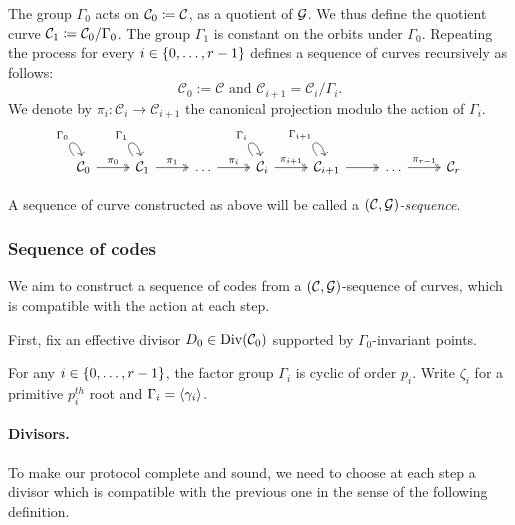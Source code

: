 \documentclass[10pt]{article}
\begin{document}
The group $\Gamma_0$ acts on $\mathcal{C}_0\coloneqq \mathcal{C}$, as a quotient of $\mathcal{G}$. We thus define the quotient curve $\mathcal{C}_1 \coloneqq \mathcal{C}_0 / \Gamma_0$. The group $\Gamma_1$ is constant on the orbits under $\Gamma_0$. Repeating the process for every $i \in \left\{0,\dots,r-1\right\}$ defines a sequence of curves recursively  as follows:
\[\mathcal{C}_0:=\mathcal{C} \text{ and } \mathcal{C}_{i+1}=\mathcal{C}_i/\Gamma_i.\]
We denote by $\pi_i: \mathcal{C}_i \rightarrow \mathcal{C}_{i+1}$ the canonical projection modulo the action of $\Gamma_i$.
\begin{equation}\label{diag:seq_curves}
	\begin{tikzcd}
		\mathcal{C}_0\arrow[loop, distance=14, out=130, in=100,"\Gamma_0"] \arrow[r, two heads, "\pi_0"] & \mathcal{C}_1\arrow[loop, distance=14, out=130, in=100,"\Gamma_1"] \arrow[r, two heads, "\pi_1"] & \dots  \arrow[r, two heads, "\pi_i"] & \mathcal{C}_i\arrow[loop, distance=14, out=130, in=100,"\Gamma_i"] \arrow[r, two heads, "\pi_{i+1}"]& \mathcal{C}_{i+1}\arrow[loop, distance=14, out=130, in=100,"\Gamma_{i+1}"] \arrow[r, two heads] & \dots \arrow[r, two heads,"\pi_{r-1}"] & \mathcal{C}_{r}
	\end{tikzcd}
\end{equation}

\begin{definition}
	A sequence of curve constructed as above will be called a \emph{$(\mathcal{C},\mathcal{G})$-sequence}.
\end{definition}

\subsubsection{Sequence of codes}\label{subsubsec:def-codes}

We aim to construct a sequence of codes from a $(\mathcal{C},\mathcal{G})$-sequence of curves, which is compatible with the action at each step.

First, fix an effective divisor $D_0 \in \operatorname{Div}(\mathcal{C}_0)$ supported by $\Gamma_0$-invariant points.

For any $i \in \left\{0,\dots,r-1\right\}$, the factor group $\Gamma_i$ is cyclic of order $p_i$. Write $\zeta_i$ for a primitive $p_i^{th}$ root and $\Gamma_i=\left\langle \gamma_i \right\rangle$.

\paragraph{Divisors.}
To make our protocol complete and sound, we need to choose at each step a divisor which is compatible with the previous one in the sense of the following definition.
\end{document}
